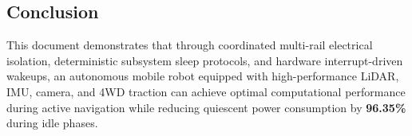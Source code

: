 \documentclass[11pt,a4paper]{article}
\begin{document}
\subsection{Conclusion}
This document demonstrates that through coordinated multi-rail electrical isolation, deterministic subsystem sleep protocols, and hardware interrupt-driven wakeups, an autonomous mobile robot equipped with high-performance LiDAR, IMU, camera, and 4WD traction can achieve optimal computational performance during active navigation while reducing quiescent power consumption by \textbf{96.35\%} during idle phases.
\end{document}
